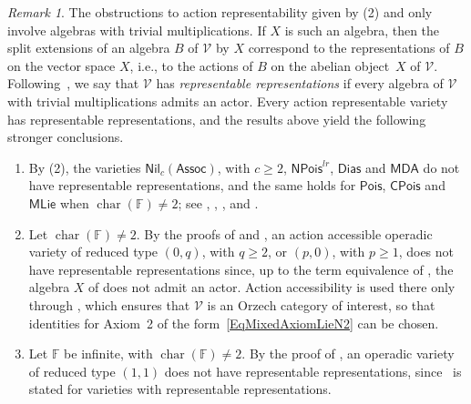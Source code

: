 \documentclass[reqno,a4paper]{amsart}
\theoremstyle{plain}
\theoremstyle{definition}
\theoremstyle{remark}
\newtheorem{remark}[subsection]{Remark}
\numberwithin{equation}{section}
\newcommand{\F}{\mathbb{F}}
\newcommand{\V}{\mathcal{V}}
\DeclareMathOperator{\bchar}{char}
\newcommand{\Assoc}{\ensuremath{\mathsf{Assoc}}}
\newcommand{\Pois}{\ensuremath{\mathsf{Pois}}}
\newcommand{\CPois}{\ensuremath{\mathsf{CPois}}}
\newcommand{\Nil}{\ensuremath{\mathsf{Nil}}}
\newcommand{\NP}{\ensuremath{\mathsf{NPois}}}
\newcommand{\Match}{\ensuremath{\mathsf{MDA}}}
\newcommand{\Dias}{\ensuremath{\mathsf{Dias}}}
\newcommand{\MatchLie}{\ensuremath{\mathsf{MLie}}}
\begin{document}
\begin{remark}\label{RemarkRepresentations}
The obstructions to action representability given by (2) and  only involve algebras with trivial multiplications. If $X$ is such an algebra, then the split extensions of an algebra $B$ of $\V$ by $X$ correspond to the representations of $B$ on the vector space $X$, i.e., to the actions of $B$ on the abelian object~$X$ of $\V$. Following~\cite{Tim}, we say that $\V$ has \emph{representable representations} if every algebra of $\V$ with trivial multiplications admits an actor. Every action representable variety has representable representations, and the results above yield the following stronger conclusions.
\begin{enumerate}
\item By (2), the varieties $\Nil_c(\Assoc)$, with $c\geq2$, $\NP^{lr}$, $\Dias$ and $\Match$ do not have representable representations, and the same holds for $\Pois$, $\CPois$ and $\MatchLie$ when $\bchar(\F)\neq2$; see , , ,  and .
\item Let $\bchar(\F)\neq2$. By the proofs of  and , an action accessible operadic variety of reduced type $(0,q)$, with $q\geq2$, or $(p,0)$, with $p\geq1$, does not have representable representations since, up to the term equivalence of , the algebra $X$ of  does not admit an actor. Action accessibility is used there only through , which ensures that $\V$ is an Orzech category of interest, so that identities for Axiom~2 of the form~\eqref{EqMixedAxiomLieN2} can be chosen.
\item Let $\F$ be infinite, with $\bchar(\F)\neq2$. By the proof of , an operadic variety of reduced type $(1,1)$ does not have representable representations, since~\cite[Theorem~6.1]{Tim} is stated for varieties with representable representations.
\end{enumerate}
\end{remark}
\end{document}
